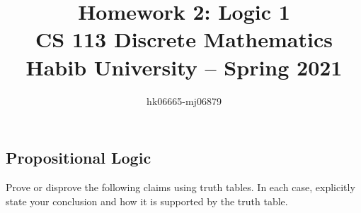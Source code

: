 \documentclass[addpoints]{exam}
\title{Homework 2: Logic 1\\ CS 113 Discrete Mathematics\\ Habib University -- Spring 2021}
\author{hk06665-mj06879 }  %
\date{}
\begin{document}
\maketitle

\begin{questions}

\section*{Propositional Logic}
  
\question Prove or disprove the following claims using truth tables. In each case, explicitly state your conclusion and how it is supported by the truth table.
\end{questions}
\end{document}
